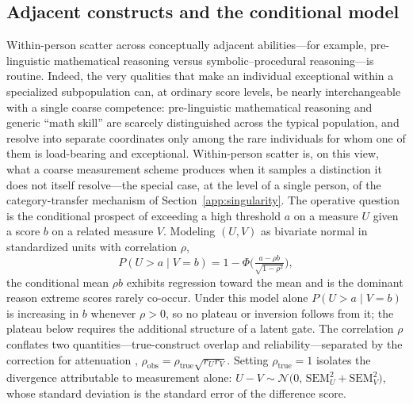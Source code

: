 \documentclass{article}
\begin{document}
\subsection{Adjacent constructs and the conditional model}\label{app:conditional}
Within-person scatter across conceptually adjacent abilities---for example, pre-linguistic mathematical reasoning versus symbolic--procedural reasoning---is routine. Indeed, the very qualities that make an individual exceptional within a specialized subpopulation can, at ordinary score levels, be nearly interchangeable with a single coarse competence: pre-linguistic mathematical reasoning and generic ``math skill'' are scarcely distinguished across the typical population, and resolve into separate coordinates only among the rare individuals for whom one of them is load-bearing and exceptional. Within-person scatter is, on this view, what a coarse measurement scheme produces when it samples a distinction it does not itself resolve---the special case, at the level of a single person, of the category-transfer mechanism of Section~\ref{app:singularity}. The operative question is the conditional prospect of exceeding a high threshold $a$ on a measure $U$ given a score $b$ on a related measure $V$. Modeling $(U,V)$ as bivariate normal in standardized units with correlation $\rho$,
\[
P(U>a\mid V=b)=1-\Phi\!\Big(\tfrac{a-\rho b}{\sqrt{1-\rho^{2}}}\Big),
\]
the conditional mean $\rho b$ exhibits regression toward the mean and is the dominant reason extreme scores rarely co-occur. Under this model alone $P(U>a\mid V=b)$ is increasing in $b$ whenever $\rho > 0$, so no plateau or inversion follows from it; the plateau below requires the additional structure of a latent gate. The correlation $\rho$ conflates two quantities---true-construct overlap and reliability---separated by the correction for attenuation \cite{spearman1904}, $\rho_{\mathrm{obs}}=\rho_{\mathrm{true}}\sqrt{r_U r_V}$. Setting $\rho_{\mathrm{true}}=1$ isolates the divergence attributable to measurement alone: $U-V\sim\mathcal N\!\big(0,\,\mathrm{SEM}_U^{2}+\mathrm{SEM}_V^{2}\big)$, whose standard deviation is the standard error of the difference score.
\end{document}
